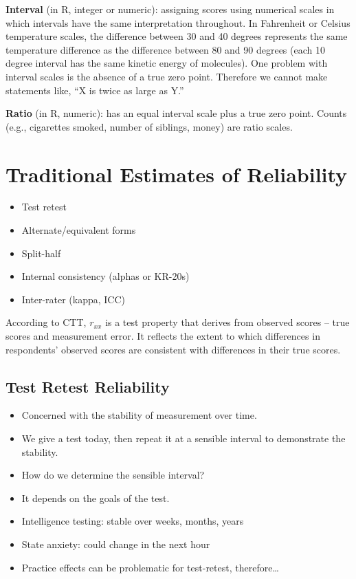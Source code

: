 \documentclass[
  english,
]{book}
\providecommand{\tightlist}{%
  \setlength{\itemsep}{0pt}\setlength{\parskip}{0pt}}
\begin{document}
\textbf{Interval} (in R, integer or numeric): assigning scores using numerical scales in which intervals have the same interpretation throughout. In Fahrenheit or Celsius temperature scales, the difference between 30 and 40 degrees represents the same temperature difference as the difference between 80 and 90 degrees (each 10 degree interval has the same kinetic energy of molecules). One problem with interval scales is the absence of a true zero point. Therefore we cannot make statements like, ``X is twice as large as Y.''

\textbf{Ratio} (in R, numeric): has an equal interval scale plus a true zero point. Counts (e.g., cigarettes smoked, number of siblings, money) are ratio scales.

\hypertarget{traditional-estimates-of-reliability}{%
\section{Traditional Estimates of Reliability}\label{traditional-estimates-of-reliability}}

\begin{itemize}
\tightlist
\item
  Test retest
\item
  Alternate/equivalent forms
\item
  Split-half
\item
  Internal consistency (alphas or KR-20s)
\item
  Inter-rater (kappa, ICC)
\end{itemize}

According to CTT, \(r_{xx}\) is a test property that derives from observed scores -- true scores and measurement error. It reflects the extent to which differences in respondents' observed scores are consistent with differences in their true scores.

\hypertarget{test-retest-reliability}{%
\subsection{Test Retest Reliability}\label{test-retest-reliability}}

\begin{itemize}
\tightlist
\item
  Concerned with the stability of measurement over time.
\item
  We give a test today, then repeat it at a sensible interval to demonstrate the stability.
\item
  How do we determine the sensible interval?
\item
  It depends on the goals of the test.
\item
  Intelligence testing: stable over weeks, months, years
\item
  State anxiety: could change in the next hour
\item
  Practice effects can be problematic for test-retest, therefore\ldots{}
\end{itemize}
\end{document}

